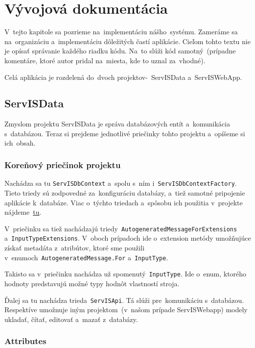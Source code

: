 \chapter{Vývojová dokumentácia}

V~tejto kapitole sa pozrieme na~implementáciu nášho~systému. Zameráme sa na~organizáciu a~implementáciu dôležitých častí aplikácie. Cieľom tohto textu nie je opísať správanie každého riadku kódu. Na~to slúži kód samotný~(prípadne komentáre, ktoré autor pridal na~miesta, kde to uznal za~vhodné).

Celá aplikácia je rozdelená do~dvoch projektov-~ServISData a~ServISWebApp.

\section{ServISData}

Zmyslom projektu ServISData je správa databázových entít a~komunikácia s~databázou. Teraz si prejdeme jednotlivé priečinky tohto projektu a~opíšeme si ich~obsah.

\subsection{Koreňový priečinok projektu}

Nachádza sa tu \verb|ServISDbContext| a~spolu s~ním i~\verb|ServISDbContextFactory|. Tieto triedy sú zodpovedné za~konfiguráciu databázy, a~tiež samotné pripojenie aplikácie k~databáze. Viac o~týchto triedach a~spôsobu ich použitia v~projekte nájdeme~\href{https://learn.microsoft.com/en-us/ef/core/dbcontext-configuration/\#using-a-dbcontext-factory-eg-for-blazor}{tu}.

V~priečinku sa tiež nachádzajú triedy~\verb|AutogeneratedMessageForExtensions| a~\verb|InputTypeExtensions|. V~oboch prípadoch ide o~extension metódy umožňujúce získať metadáta z~atribútov, ktoré sme použili v~enumoch~\verb|AutogeneratedMessage.For| a~\verb|InputType|.

Takisto sa v~priečinku nachádza už spomenutý~\verb|InputType|. Ide o~enum, ktorého hodnoty predstavujú možné typy hodnôt vlastností stroja.

Ďalej sa tu nachádza trieda~\verb|ServISApi|. Tá slúži pre~komunikáciu s~databázou. Respektíve umožnuje iným projektom~(v~našom prípade ServISWebapp) modely ukladať, čítať, editovať a~mazať z~databázy.

\subsection{Attributes}

